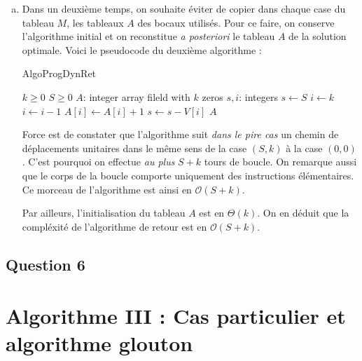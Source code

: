 \documentclass[12pt,a4paper]{article}
\newcommand{\BigO}{\mathcal{O}}
\begin{document}
\begin{enumerate}[a)]
 \item Dans un deuxi\`eme temps, on souhaite \'eviter de copier dans chaque case du tableau $M$, les tableaux $A$ des bocaux utilis\'es. Pour ce faire, on conserve l'algorithme initial et on reconstitue {\itshape a posteriori} le tableau $A$ de la solution optimale. Voici le pseudocode du deuxi\`eme algorithme :
 \begin{algorithm}
\caption{AlgoProgDynRet}
\begin{algorithmic}[1]
\Require $k \geq 0$ \AND $S \geq 0$
    \State $A$: integer array fileld with $k$ zeros
    \State $s, i$: integers
    \State $s \gets S$
    \State $i \gets k$
            \State $i \gets i-1$
        \Else
            \State $A[i] \gets A[i] + 1$
            \State $s \gets s - V[i]$
        \EndIf
    \EndWhile
    \State \Return $A$
\EndFunction
\end{algorithmic}
\end{algorithm}

 
 Force est de constater que l'algorithme suit {\itshape dans le pire cas} un chemin de d\'eplacements unitaires dans le m\^eme sens de la case $(S,k)$ \`a la case $(0,0)$. C'est pourquoi on effectue {\itshape au plus} $S+k$ tours de boucle. On remarque aussi que le corps de la boucle comporte uniquement des instructions \'el\'ementaires. Ce morceau de l'algorithme est ainsi en $\BigO(S+k)$.
 
 Par ailleurs, l'initialisation du tableau $A$ est en $\Theta(k)$. On en d\'eduit que la compl\'exit\'e de l'algorithme de retour est en $\BigO(S+k)$. 
\end{enumerate}

\subsection*{Question 6}

\section{Algorithme III : Cas particulier et algorithme glouton}
\end{document}
